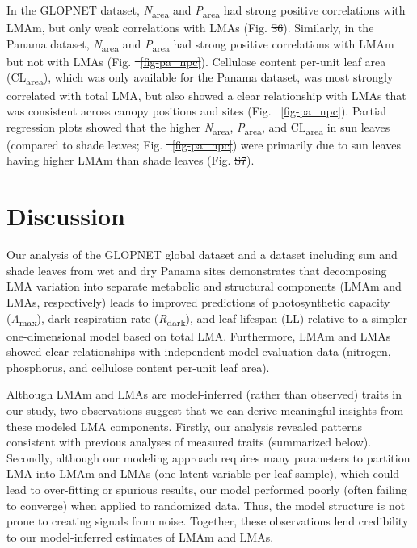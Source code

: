 \documentclass[
  12pt,
  letterpaper,
  DIV=11,
  numbers=noendperiod]{scrartcl}
\providecommand{\DIFadd}[1]{{\protect\color{blue}\uwave{#1}}} %
\providecommand{\DIFdel}[1]{{\protect\color{red}\sout{#1}}}                      %
\providecommand{\DIFaddbegin}{} %
\providecommand{\DIFaddend}{} %
\providecommand{\DIFdelbegin}{} %
\providecommand{\DIFdelend}{} %
\newcommand{\DIFscaledelfig}{0.5}
\newlength{\DIFdelgraphicswidth} %
\newlength{\DIFdelgraphicsheight} %
\newcommand{\DIFaddincludegraphics}[2][]{{\color{blue}\fbox{\DIFOincludegraphics[#1]{#2}}}} %
\newcommand{\DIFdelincludegraphics}[2][]{%
\sbox{\DIFdelgraphicsbox}{\DIFOincludegraphics[#1]{#2}}%
\settoboxwidth{\DIFdelgraphicswidth}{\DIFdelgraphicsbox} %
\settoboxtotalheight{\DIFdelgraphicsheight}{\DIFdelgraphicsbox} %
\scalebox{\DIFscaledelfig}{%
\parbox[b]{\DIFdelgraphicswidth}{\usebox{\DIFdelgraphicsbox}\\[-\baselineskip] \rule{\DIFdelgraphicswidth}{0em}}\llap{\resizebox{\DIFdelgraphicswidth}{\DIFdelgraphicsheight}{%
\setlength{\unitlength}{\DIFdelgraphicswidth}%
\begin{picture}(1,1)%
\thicklines\linethickness{2pt} %
{\color[rgb]{1,0,0}\put(0,0){\framebox(1,1){}}}%
{\color[rgb]{1,0,0}\put(0,0){\line( 1,1){1}}}%
{\color[rgb]{1,0,0}\put(0,1){\line(1,-1){1}}}%
\end{picture}%
}\hspace*{3pt}}} %
} %
\DeclareRobustCommand{\DIFaddbegin}{\DIFOaddbegin \let\includegraphics\DIFaddincludegraphics} %
\DeclareRobustCommand{\DIFaddend}{\DIFOaddend \let\includegraphics\DIFOincludegraphics} %
\DeclareRobustCommand{\DIFdelbegin}{\DIFOdelbegin \let\includegraphics\DIFdelincludegraphics} %
\DeclareRobustCommand{\DIFdelend}{\DIFOaddend \let\includegraphics\DIFOincludegraphics} %
\begin{document}
In the GLOPNET dataset, \emph{N}\textsubscript{area} and
\emph{P}\textsubscript{area} had strong positive correlations with LMAm,
but only weak correlations with LMAs (Fig. \DIFdelbegin \DIFdel{S6}\DIFdelend \DIFaddbegin \DIFadd{S7}\DIFaddend ). Similarly, in the Panama
dataset, \emph{N}\textsubscript{area} and \emph{P}\textsubscript{area}
had strong positive correlations with LMAm but not with LMAs (Fig. \DIFdelbegin \DIFdel{~\ref{fig-pa_npc}}\DIFdelend \DIFaddbegin \DIFadd{S8}\DIFaddend ).
Cellulose content per-unit leaf area (CL\textsubscript{area}), which was
only available for the Panama dataset, was most strongly correlated with
total LMA, but also showed a clear relationship with LMAs that was
consistent across canopy positions and sites (Fig. \DIFdelbegin \DIFdel{~\ref{fig-pa_npc}}\DIFdelend \DIFaddbegin \DIFadd{S8}\DIFaddend ). Partial
regression plots showed that the higher \emph{N}\textsubscript{area},
\emph{P}\textsubscript{area}, and CL\textsubscript{area} in sun leaves
(compared to shade leaves; Fig. \DIFdelbegin \DIFdel{~\ref{fig-pa_npc}}\DIFdelend \DIFaddbegin \DIFadd{S8}\DIFaddend ) were primarily due to sun leaves
having higher LMAm than shade leaves (Fig. \DIFdelbegin \DIFdel{S7}\DIFdelend \DIFaddbegin \DIFadd{S9}\DIFaddend ).

\section{Discussion}\label{discussion}

Our analysis of the GLOPNET global dataset and a dataset including sun
and shade leaves from wet and dry Panama sites demonstrates that
decomposing LMA variation into separate metabolic and structural
components (LMAm and LMAs, respectively) leads to improved predictions
of photosynthetic capacity (\emph{A}\textsubscript{max}), dark
respiration rate (\emph{R}\textsubscript{dark}), and leaf lifespan (LL)
relative to a simpler one-dimensional model based on total LMA.
Furthermore, LMAm and LMAs showed clear relationships with independent
model evaluation data (nitrogen, phosphorus, and cellulose content
per-unit leaf area).

Although LMAm and LMAs are model-inferred (rather than observed) traits
in our study, two observations suggest that we can derive meaningful
insights from these modeled LMA components. Firstly, our analysis
revealed patterns consistent with previous analyses of measured traits
(summarized below). Secondly, although our modeling approach requires
many parameters to partition LMA into LMAm and LMAs (one latent variable
per leaf sample), which could lead to over-fitting or spurious results,
our model performed poorly (often failing to converge) when applied to
randomized data. Thus, the model structure is not prone to creating
signals from noise. Together, these observations lend credibility to our
model-inferred estimates of LMAm and LMAs.
\end{document}

